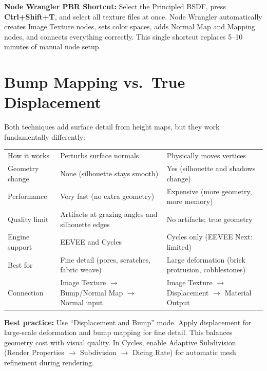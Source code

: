 \begin{shortcutbox}
\textbf{Node Wrangler PBR Shortcut:} Select the Principled BSDF,
press \textbf{Ctrl+Shift+T}, and select all texture files at once.
Node Wrangler automatically creates Image Texture nodes, sets color
spaces, adds Normal Map and Mapping nodes, and connects everything
correctly. This single shortcut replaces 5--10 minutes of manual
node setup.
\end{shortcutbox}


\section{Bump Mapping vs.\ True Displacement}
\label{sec:shading:displacement}

Both techniques add surface detail from height maps, but they work
fundamentally differently:

\begin{center}
\begin{tabularx}{\textwidth}{L{3cm}XX}
\toprule
{}
 &  &  \\
\midrule
How it works & Perturbs surface normals & Physically moves vertices \\
Geometry change & None (silhouette stays smooth) & Yes (silhouette and shadows change) \\
Performance & Very fast (no extra geometry) & Expensive (more geometry, more memory) \\
Quality limit & Artifacts at grazing angles and silhouette edges & No artifacts; true geometry \\
Engine support & EEVEE and Cycles & Cycles only (EEVEE Next: limited) \\
Best for & Fine detail (pores, scratches, fabric weave) & Large deformation (brick protrusion, cobblestones) \\
Connection & Image Texture $\rightarrow$ Bump/Normal Map $\rightarrow$ Normal input & Image Texture $\rightarrow$ Displacement $\rightarrow$ Material Output \\
\bottomrule
\end{tabularx}
\end{center}

\begin{tipbox}
\textbf{Best practice:} Use ``Displacement and Bump'' mode. Apply
displacement for large-scale deformation and bump mapping for fine
detail. This balances geometry cost with visual quality. In Cycles,
enable Adaptive Subdivision (Render Properties $\rightarrow$
Subdivision $\rightarrow$ Dicing Rate) for automatic mesh
refinement during rendering.
\end{tipbox}


